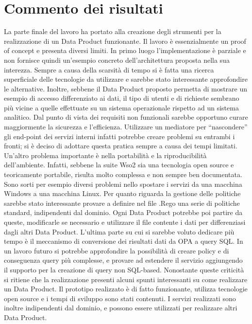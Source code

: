 \documentclass[12pt]{report}
\begin{document}
\section{Commento dei risultati}
La parte finale del lavoro ha portato alla creazione degli strumenti per la realizzazione di un Data Product funzionante.
Il lavoro è essenzialmente un proof of concept e presenta diversi limiti.
In primo luogo l'implementazione è parziale e non fornisce quindi un'esempio concreto dell'architettura proposta nella sua interezza.
Sempre a causa della scarsità di tempo si è fatta una ricerca superficiale delle tecnologie da utilizzare e sarebbe stato interessante approfondire le alternative.
Inoltre, sebbene il Data Product proposto permetta di mostrare un esempio di accesso differenziato ai dati, il tipo di utenti e di richieste sembrano più vicine a quelle effettuate su un sistema operazionale rispetto ad un sistema analitico.
Dal punto di vista dei requisiti non funzionali sarebbe opportuno curare maggiormente la sicurezza e l'efficienza. 
Utilizzare un mediatore per ``nascondere'' gli end-point dei servizi interni infatti potrebbe creare problemi su entrambi i fronti; si è deciso di adottare questa pratica sempre a causa dei tempi limitati.
Un'altro problema importante è nella portabilità e la riproducibilità dell'ambiente. 
Infatti, sebbene la suite Wso2 sia una tecnologia open source e teoricamente portabile, risulta molto complessa e non sempre ben documentata. 
Sono sorti per esempio diversi problemi nello spostare i servizi da una macchina Windows a una macchina Linux.
Per quanto riguarda la gestione delle politiche sarebbe stato interessante provare a definire nel file .Rego una serie di politiche standard, indipendenti dal dominio.
Ogni Data Product potrebbe poi partire da queste, modificarle se necessario e utilizzare il file contente i dati per differenziasi dagli altri Data Product.
L'ultima parte su cui si sarebbe voluto dedicare più tempo è il meccanismo di conversione dei risultati dati da OPA a query SQL.
In un lavoro futuro si potrebbe approfondire la possibilità di creare policy e di conseguenza query più complesse, e provare ad estendere il servizio aggiungendo il supporto per la creazione di query non SQL-based.
Nonostante queste criticità si ritiene che la realizzazione presenti alcuni spunti interessanti su come realizzare un Data Product.
Il prototipo realizzato è di fatto funzionante, utilizza tecnologie open source e i tempi di sviluppo sono stati contenuti.
I servizi realizzati sono inoltre indipendenti dal dominio, e possono essere utilizzati per realizzare altri Data Product.
\end{document}
